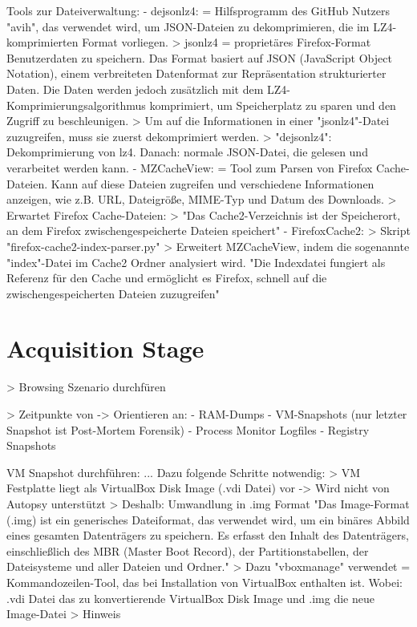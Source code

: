 Tools zur Dateiverwaltung:
	- dejsonlz4: %
		= Hilfsprogramm des GitHub Nutzers "avih", das verwendet wird, um JSON-Dateien zu dekomprimieren, die im LZ4-komprimierten Format vorliegen.
		> jsonlz4 = proprietäres Firefox-Format Benutzerdaten zu speichern. Das Format basiert auf JSON (JavaScript Object Notation), einem verbreiteten Datenformat zur Repräsentation strukturierter Daten. Die Daten werden jedoch zusätzlich mit dem LZ4-Komprimierungsalgorithmus komprimiert, um Speicherplatz zu sparen und den Zugriff zu beschleunigen.
		> Um auf die Informationen in einer "jsonlz4"-Datei zuzugreifen, muss sie zuerst dekomprimiert werden. 
		> "dejsonlz4": Dekomprimierung von lz4. Danach: normale JSON-Datei, die gelesen und verarbeitet werden kann.
	- MZCacheView:
		= Tool zum Parsen von Firefox Cache-Dateien. Kann auf diese Dateien zugreifen und verschiedene Informationen anzeigen, wie z.B. URL, Dateigröße, MIME-Typ und Datum des Downloads.
		> Erwartet Firefox Cache-Dateien: %
		> "Das Cache2-Verzeichnis ist der Speicherort, an dem Firefox zwischengespeicherte Dateien speichert" %
	- FirefoxCache2: %
		> Skript "firefox-cache2-index-parser.py"
		> Erweitert MZCacheView, indem die sogenannte "index"-Datei im Cache2 Ordner analysiert wird.
			"Die Indexdatei fungiert als Referenz für den Cache und ermöglicht es Firefox, schnell auf die zwischengespeicherten Dateien zuzugreifen"

\section{Acquisition Stage}

> Browsing Szenario durchfüren

> Zeitpunkte von -> Orientieren an: \cite{Muir.2019}
	- RAM-Dumps 
	- VM-Snapshots (nur letzter Snapshot ist Post-Mortem Forensik)
	- Process Monitor Logfiles
	- Registry Snapshots

VM Snapshot durchführen:
	...
	Dazu folgende Schritte notwendig:
		> VM Festplatte liegt als VirtualBox Disk Image (.vdi  Datei) vor -> Wird nicht von Autopsy unterstützt
		> Deshalb: Umwandlung in .img Format
			"Das Image-Format (.img) ist ein generisches Dateiformat, das verwendet wird, um ein binäres Abbild eines gesamten Datenträgers zu speichern. Es erfasst den Inhalt des Datenträgers, einschließlich des MBR (Master Boot Record), der Partitionstabellen, der Dateisysteme und aller Dateien und Ordner."
		> Dazu "vboxmanage" verwendet = Kommandozeilen-Tool, das bei Installation von VirtualBox enthalten ist.	
		  	Wobei: .vdi Datei das zu konvertierende VirtualBox Disk Image und .img die neue Image-Datei
		> Hinweis


